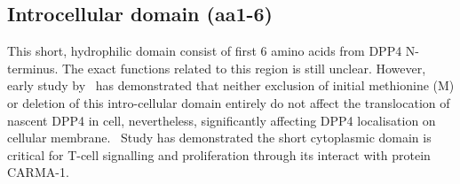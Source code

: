 \subsection{Introcellular domain (aa1-6)}

This short, hydrophilic domain consist of first 6 amino acids from DPP4 N-terminus. The exact functions related to this region is still unclear. However, early study by~\citet{Hong1990} has demonstrated that neither exclusion of initial methionine (M) or deletion of this intro-cellular domain entirely do not affect the translocation of nascent DPP4 in cell, nevertheless, significantly affecting DPP4 localisation on cellular membrane. 
\
Study has demonstrated the short cytoplasmic domain is critical for T-cell signalling and proliferation through its interact with protein CARMA-1. \cite{Ohnuma_2007}